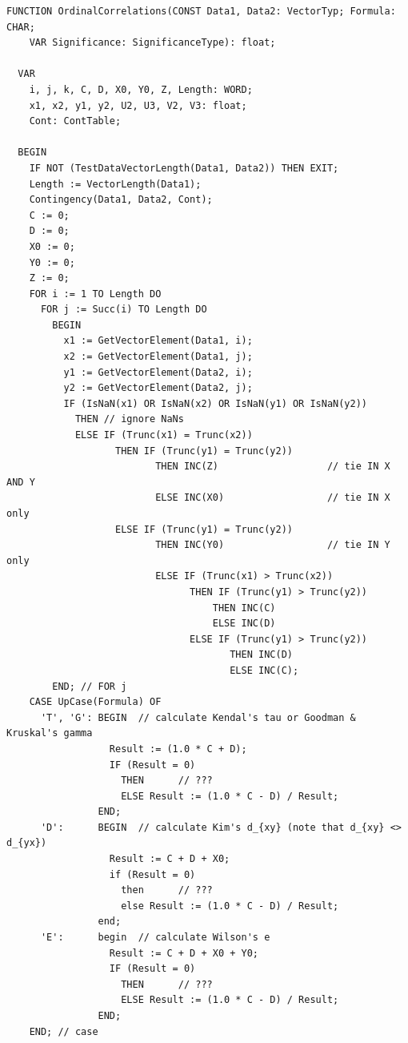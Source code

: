 \begin{refsection}
\begin{lstlisting}[caption= Correlation coefficients for ordinal/ordinal associations]
  FUNCTION OrdinalCorrelations(CONST Data1, Data2: VectorTyp; Formula: CHAR;
    VAR Significance: SignificanceType): float;

  VAR
    i, j, k, C, D, X0, Y0, Z, Length: WORD;
    x1, x2, y1, y2, U2, U3, V2, V3: float;
    Cont: ContTable;

  BEGIN
    IF NOT (TestDataVectorLength(Data1, Data2)) THEN EXIT;
    Length := VectorLength(Data1);
    Contingency(Data1, Data2, Cont);
    C := 0;
    D := 0;
    X0 := 0;
    Y0 := 0;
    Z := 0;
    FOR i := 1 TO Length DO
      FOR j := Succ(i) TO Length DO
        BEGIN
          x1 := GetVectorElement(Data1, i);
          x2 := GetVectorElement(Data1, j);
          y1 := GetVectorElement(Data2, i);
          y2 := GetVectorElement(Data2, j);
          IF (IsNaN(x1) OR IsNaN(x2) OR IsNaN(y1) OR IsNaN(y2))
            THEN // ignore NaNs
            ELSE IF (Trunc(x1) = Trunc(x2))
                   THEN IF (Trunc(y1) = Trunc(y2))
                          THEN INC(Z)                   // tie IN X AND Y
                          ELSE INC(X0)                  // tie IN X only
                   ELSE IF (Trunc(y1) = Trunc(y2))
                          THEN INC(Y0)                  // tie IN Y only
                          ELSE IF (Trunc(x1) > Trunc(x2))
                                THEN IF (Trunc(y1) > Trunc(y2))
                                    THEN INC(C)
                                    ELSE INC(D)
                                ELSE IF (Trunc(y1) > Trunc(y2))
                                       THEN INC(D)
                                       ELSE INC(C);
        END; // FOR j
    CASE UpCase(Formula) OF
      'T', 'G': BEGIN  // calculate Kendal's tau or Goodman & Kruskal's gamma
                  Result := (1.0 * C + D);
                  IF (Result = 0)
                    THEN      // ???
                    ELSE Result := (1.0 * C - D) / Result;
                END;
      'D':      BEGIN  // calculate Kim's d_{xy} (note that d_{xy} <> d_{yx})
                  Result := C + D + X0;
                  if (Result = 0)
                    then      // ???
                    else Result := (1.0 * C - D) / Result;
                end;
      'E':      begin  // calculate Wilson's e
                  Result := C + D + X0 + Y0;
                  IF (Result = 0)
                    THEN      // ???
                    ELSE Result := (1.0 * C - D) / Result;
                END;
    END; // case

\end{lstlisting}
\end{refsection}
